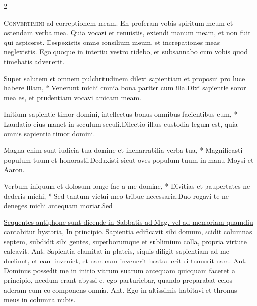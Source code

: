 \begin{multicols*}{2}
\begin{responsory}
\end{responsory}%
\lettrine[lines=2]{\zallmancaps \color{Red} C}{onvertimini} ad correptionem meam. En proferam vobis spiritum meum et ostendam verba mea. Quia vocavi et renuistis, extendi manum meam, et non fuit qui aspiceret. Despexistis omne consilium meum, et increpationes meas neglexistis. Ego quoque in interitu vestro ridebo, et subsannabo cum vobis quod timebatis advenerit.
\begin{responsory-doxology}
{Super salutem et omnem pulchritudinem dilexi sapientiam et proposui pro luce habere illam, * Venerunt michi omnia bona pariter cum illa.}{Dixi sapientie soror mea es, et prudentiam vocavi amicam meam.}
\end{responsory-doxology}%
\begin{responsory}
{Initium sapientie timor domini, intellectus bonus omnibus facientibus eum, * Laudatio eius manet in seculum seculi.}{Dilectio illius custodia legum est, quia omnis sapientia timor domini.}
\end{responsory}%
\begin{responsory}
{Magna enim sunt iudicia tua domine et inenarrabilia verba tua, * Magnificasti populum tuum et honorasti.}{Deduxisti sicut oves populum tuum in manu Moysi et Aaron.}
\end{responsory}%
\begin{responsory-final}
{Verbum iniquum et dolosum longe fac a me domine, * Divitias et paupertates ne dederis michi, * Sed tantum victui meo tribue necessaria.}{Duo rogavi te ne deneges michi antequam moriar.}{Sed}
\end{responsory-final}%
\newline \ul{Sequentes antiphone sunt dicende in Sabbatis ad Mag. vel ad memoriam quamdiu cantabitur hystoria,} \hyperlink{in-principio}{In principio.}
 Sapientia edificavit sibi domum, scidit columnas septem, subdidit sibi gentes, superborumque et sublimium colla, propria virtute calcavit. {\color{Red} Ant.} Sapientia clamitat in plateis, siquis diligit sapientiam ad me declinet, et eam inveniet, et eam cum invenerit beatus erit si tenuerit eam. {\color{Red} Ant.} Dominus possedit me in initio viarum suarum antequam quicquam faceret a principio, necdum erant abyssi et ego parturiebar, quando preparabat celos aderam cum eo componens omnia. {\color{Red} Ant.} Ego in altissimis habitavi et thronus meus in columna nubis.

\end{multicols*}
